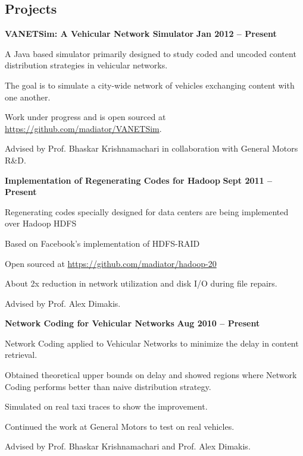 \documentclass[margin,line]{resume}
\begin{document}
\begin{resume}
\section{\mysidestyle Projects}

  \textbf{VANETSim: A Vehicular Network Simulator} \hfill \textbf{Jan 2012 -- Present}
  \begin{list2}
   \item A Java based simulator primarily designed to study coded and uncoded content distribution strategies in vehicular networks.
   \item The goal is to simulate a city-wide network of vehicles exchanging content with one another. 
   \item Work under progress and is open sourced at \href{https://github.com/madiator/VANETSim}{https://github.com/madiator/VANETSim}.
   \item Advised by Prof. Bhaskar Krishnamachari in collaboration with General Motors R\&D.
  \end{list2}

  \textbf{Implementation of Regenerating Codes for Hadoop} \hfill \textbf{Sept 2011 -- Present}
  \begin{list2}
   \item Regenerating codes specially designed for data centers are being implemented over Hadoop HDFS
   \item Based on Facebook's implementation of HDFS-RAID
   \item Open sourced at \href{https://github.com/madiator/hadoop-20}{https://github.com/madiator/hadoop-20}
   \item About 2x reduction in network utilization and disk I/O during file repairs.
   \item Advised by Prof. Alex Dimakis. 
  \end{list2}
  
  \textbf{Network Coding for Vehicular Networks} \hfill \textbf{Aug 2010 -- Present}
  \begin{list2}
   \item Network Coding applied to Vehicular Networks to minimize the delay in content retrieval. 
   \item Obtained theoretical upper bounds on delay and showed regions where Network Coding performs better than naive distribution strategy.
   \item Simulated on real taxi traces to show the improvement.
   \item Continued the work at General Motors to test on real vehicles. 
   \item Advised by Prof. Bhaskar Krishnamachari and Prof. Alex Dimakis. 
  \end{list2}
  

\end{resume}
\end{document}
